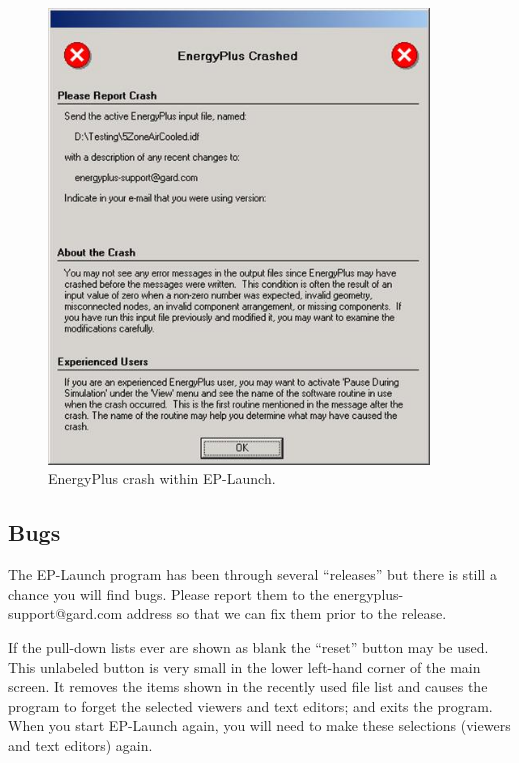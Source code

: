 \begin{figure}[hbtp] %
\centering
\includegraphics[width=0.9\textwidth, height=0.9\textheight, keepaspectratio=true]{media/image010.jpg}
\caption{EnergyPlus crash within EP-Launch. \protect \label{fig:energyplus-crash-within-ep-launch.}}
\end{figure}

\subsection{Bugs}\label{bugs}

The EP-Launch program has been through several ``releases'' but there is still a chance you will find bugs. Please report them to the energyplus-support@gard.com address so that we can fix them prior to the release.

If the pull-down lists ever are shown as blank the ``reset'' button may be used. This unlabeled button is very small in the lower left-hand corner of the main screen. It removes the items shown in the recently used file list and causes the program to forget the selected viewers and text editors; and exits the program. When you start EP-Launch again, you will need to make these selections (viewers and text editors) again.
